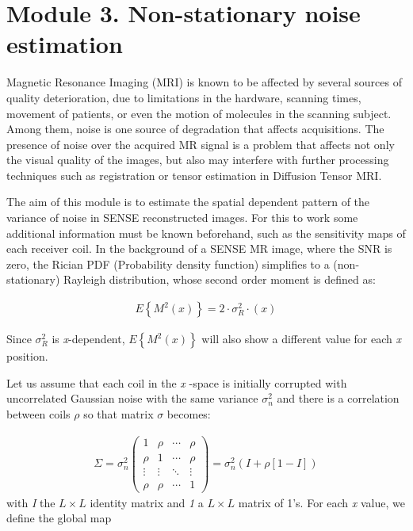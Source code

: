 \section{Module 3. Non-stationary noise estimation}

Magnetic Resonance Imaging (MRI) is known to be affected by several
sources of quality deterioration, due to limitations in the hardware,
scanning times, movement of patients, or even the motion of molecules
in the scanning subject. Among them, noise is one source of degradation
that affects acquisitions. The presence of noise over the acquired
MR signal is a problem that affects not only the visual quality of
the images, but also may interfere with further processing techniques
such as registration or tensor estimation in Diffusion Tensor MRI.

The aim of this module is to estimate the spatial dependent pattern
of the variance of noise in SENSE reconstructed images. For this to
work some additional information must be known beforehand, such as
the sensitivity maps of each receiver coil. In the background of a
SENSE MR image, where the SNR is zero, the Rician PDF (Probability
density function) simplifies to a (non-stationary) Rayleigh distribution,
whose second order moment is defined as:

\begin{equation}
\begin{aligned}E\left\{ M^{2}\left(x\right)\right\} =2\cdot\sigma_{R}^{2}\cdot\left(x\right)\end{aligned}
\end{equation}

Since $\sigma_{R}^{2}$ is \textit{x}-dependent, $E\left\{ M^{2}\left(x\right)\right\} $
will also show a different value for each \textit{x} position.

Let us assume that each coil in the \textit{x} -space is initially
corrupted with uncorrelated Gaussian noise with the same variance
$\sigma_{n}^{2}$ and there is a correlation between coils $\rho$
so that matrix $\sigma$ becomes:

\begin{equation}
\begin{aligned}\Sigma=\sigma_{n}^{2}\begin{pmatrix}1 & \rho & \cdots & \rho\\
\rho & 1 & \cdots & \rho\\
\vdots & \vdots & \ddots & \vdots\\
\rho & \rho & \cdots & 1
\end{pmatrix}=\sigma_{n}^{2}\left(I+\rho\left[1-I\right]\right)\end{aligned}
\end{equation}
with \textit{I} the $L\times L$ identity matrix and \textit{1} a
$L\times L$ matrix of 1's. For each \textit{x} value, we define the
global map

